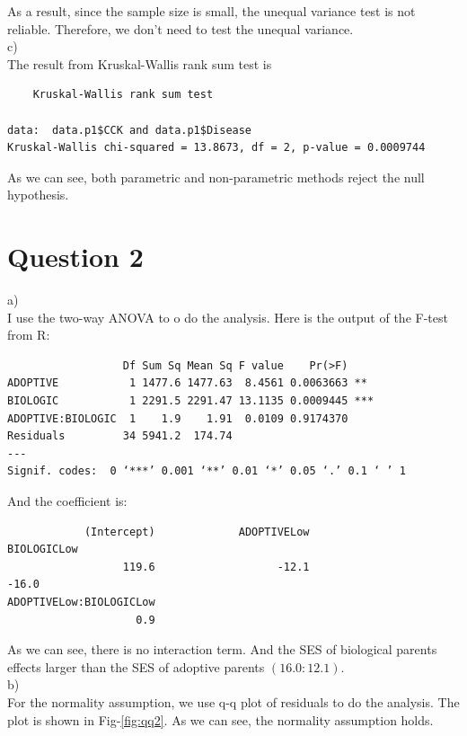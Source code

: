 \documentclass[12pt]{article}
\begin{document}
As a result, since the sample size is small, the unequal variance test
is not reliable. Therefore, we don't need to test the unequal
variance. \\

c) \\

The result from Kruskal-Wallis rank sum test is 

\begin{verbatim}
	Kruskal-Wallis rank sum test

data:  data.p1$CCK and data.p1$Disease 
Kruskal-Wallis chi-squared = 13.8673, df = 2, p-value = 0.0009744
\end{verbatim}

As we can see, both parametric and non-parametric methods reject the
null hypothesis.

\section*{Question 2}

a) \\

I use the two-way ANOVA to o do the analysis. Here is the output of
the F-test from R:

\begin{verbatim}
                  Df Sum Sq Mean Sq F value    Pr(>F)    
ADOPTIVE           1 1477.6 1477.63  8.4561 0.0063663 ** 
BIOLOGIC           1 2291.5 2291.47 13.1135 0.0009445 ***
ADOPTIVE:BIOLOGIC  1    1.9    1.91  0.0109 0.9174370    
Residuals         34 5941.2  174.74                      
---
Signif. codes:  0 ‘***’ 0.001 ‘**’ 0.01 ‘*’ 0.05 ‘.’ 0.1 ‘ ’ 1 
\end{verbatim}

And the coefficient is:

\begin{verbatim}
            (Intercept)             ADOPTIVELow             BIOLOGICLow 
                  119.6                   -12.1                   -16.0 
ADOPTIVELow:BIOLOGICLow 
                    0.9
\end{verbatim}

As we can see, there is no interaction term. And the SES of biological
parents effects larger than the SES of adoptive parents
$(16.0:12.1)$. \\

b) \\

For the normality assumption, we use q-q plot of residuals to do
the analysis. The plot is shown in Fig-\ref{fig:qq2}. As we can see,
the normality assumption holds.
\end{document}
